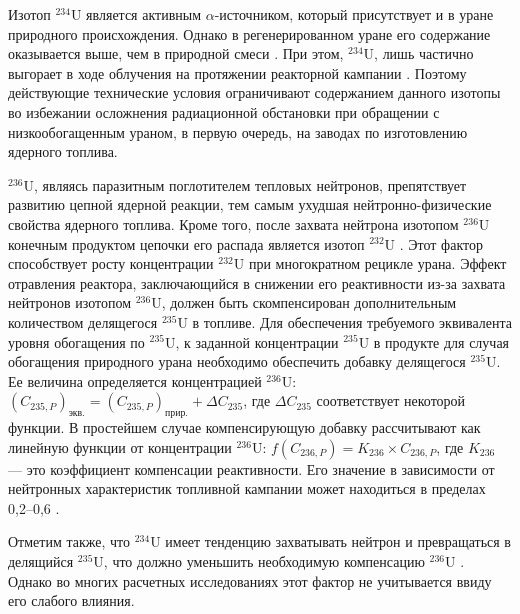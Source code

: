 Изотоп $^{234}$U является активным $\alpha$-источником, который присутствует и в уране природного происхождения. Однако в регенерированном уране его содержание оказывается выше, чем в природной смеси \cite{matveevUran232EgoVliyanie1985,kryuchkovObogashchennyyUranDobavleniem2007}. При этом, $^{234}$U, лишь частично выгорает в ходе облучения на протяжении реакторной кампании \cite{gresleyEnrichingRecyclingUranium1988}. Поэтому действующие технические условия ограничивают содержанием данного изотопы во избежании осложнения радиационной обстановки при обращении с низкообогащенным ураном, в первую очередь, на заводах по изготовлению ядерного топлива.

$^{236}$U, являясь паразитным поглотителем тепловых нейтронов, препятствует развитию цепной ядерной реакции, тем самым ухудшая нейтронно-физические свойства ядерного топлива. Кроме того, после захвата нейтрона изотопом  $^{236}$U конечным продуктом цепочки его распада является изотоп  $^{232}$U \cite{ksenof88}. Этот фактор способствует росту концентрации $^{232}$U при многократном рецикле урана. 
Эффект отравления реактора, заключающийся в снижении его реактивности из-за захвата нейтронов изотопом  $^{236}$U, должен быть скомпенсирован дополнительным количеством делящегося $^{235}$U в топливе. Для обеспечения требуемого эквивалента уровня обогащения по $^{235}$U, к заданной концентрации $^{235}$U в продукте для случая обогащения природного урана необходимо обеспечить добавку делящегося $^{235}$U.
Ее величина определяется концентрацией $^{236}$U:
$(C_{235,P})_\textit{экв.}=(C_{235,P})_\textit{прир.}+\Delta C_{235}$, где $\Delta C_{235}$ соответствует некоторой функции. В простейшем случае компенсирующую добавку рассчитывают как линейную функции от концентрации $^{236}$U: $f(C_{236,P})=K_{236} \times C_{236,P}$, где $K_{236}$ --- это коэффициент компенсации реактивности. Его значение в зависимости от нейтронных характеристик топливной кампании может находиться в пределах 0,2--0,6 \cite{delagarzaMulticomponentIsotopeSeparation1961, borodynyaIssledovanieProblemyVovlecheniya1989,delculAnalysisReuseUranium2009}.


Отметим также, что $^{234}$U имеет тенденцию захватывать нейтрон и превращаться в делящийся $^{235}$U, что должно уменьшить необходимую компенсацию $^{236}$U \cite{dyachenkoIspolzovanieRegenerirovannogoUrana2012}. Однако во многих расчетных исследованиях этот фактор не учитывается ввиду его слабого влияния.


